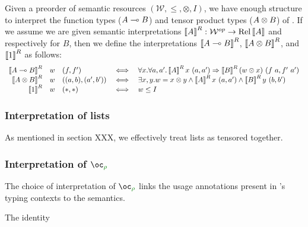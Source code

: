 Given a preorder of semantic resources
$(\mathcal{W}, \leq, \otimes, I)$, we have enough structure to
interpret the function types ($A \multimap B$) and tensor product types
($A \otimes B$) of \name{}. If we assume we are given semantic
interpretations
$\left\llbracket A \right\rrbracket^R : \mathcal{W}^{op} \to \operatorname{Rel}{\left\llbracket A \right\rrbracket}$ and
respectively for $B$, then we define the interpretations
$\left\llbracket A \multimap B \right\rrbracket^R$, $\left\llbracket A \otimes B \right\rrbracket^R$, and
$\left\llbracket 1 \right\rrbracket^R$ as follows:
\begin{displaymath}
  \begin{array}{rllcl}
    \left\llbracket A \multimap B \right\rrbracket^R & w & (f,f')
    &\iff& \forall x. \forall a,a'.\left\llbracket A \right\rrbracket^Rx~(a,a')
           \Rightarrow \left\llbracket B \right\rrbracket^R(w \otimes x)~(f~a,f'~a')
    \\
    \left\llbracket A \otimes B \right\rrbracket^R & w & ((a,b),(a',b'))
    &\iff& \exists x,y.
           w = x \otimes y
           \wedge \left\llbracket A \right\rrbracket^Rx~(a,a')
           \wedge \left\llbracket B \right\rrbracket^Ry~(b,b')
    \\
    \left\llbracket 1 \right\rrbracket^R & w & (*,*) &\iff& w \leq I
  \end{array}
\end{displaymath}



\subsubsection{Interpretation of lists}

As mentioned in section XXX, we effectively treat lists as tensored
together. 

\subsubsection{Interpretation of $\excl{\rho}{}$}

The choice of interpretation of $\excl{\rho}{}$ links the usage
annotations present in \name{}'s typing contexts to the semantics.

\begin{example}[Trivial]
  The identity
\end{example}

